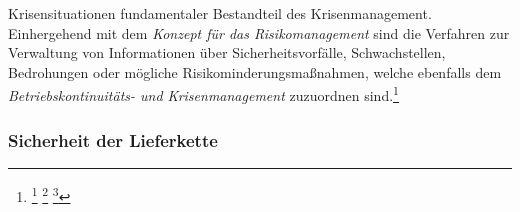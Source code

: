 \documentclass[11pt,a4paper,hidelinks]{article}   %
\begin{document}
Krisensituationen fundamentaler Bestandteil des Krisenmanagement. Einhergehend mit dem \emph{Konzept für das Risikomanagement} sind die Verfahren zur Verwaltung von Informationen über Sicherheitsvorfälle, Schwachstellen, Bedrohungen oder mögliche Risikominderungsmaßnahmen, welche ebenfalls dem \emph{Betriebskontinuitäts- und Krisenmanagement} zuzuordnen sind.\footnote{
                \footcite[Vgl. Nummer 4,][, Anhang]{EU2024-2690}
                \footcite[Vgl. Artikel 22, Absatz 1,][]{EU2022-2555}
                \footcite[Vgl. §30 Absatz 2, Nummer 3,][]{NIS2UmsuCG}
            }

            \subsubsection{Sicherheit der Lieferkette}
\end{document}

